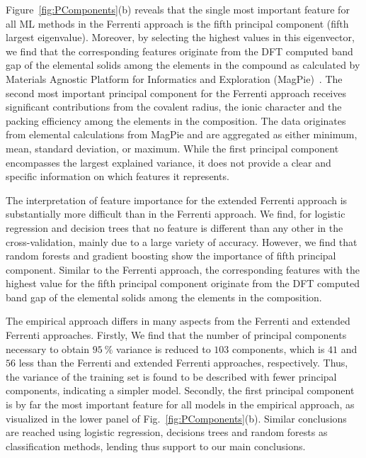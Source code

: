 \documentclass[superscriptaddress,unsortedaddress,
 amsmath,amssymb,
 aps,
]{revtex4-2}
\begin{document}
Figure~\ref{fig:PComponents}(b) reveals that the single most important feature for all ML methods in the Ferrenti approach is the fifth principal component (fifth largest eigenvalue). Moreover, by selecting the highest values in this eigenvector, we find that the corresponding features originate from the DFT computed band gap of the elemental solids among the elements in the compound as calculated by Materials Agnostic Platform for Informatics and Exploration (MagPie)~\cite{magpie}. 
The second most important principal component for the Ferrenti approach receives significant contributions from the  
covalent radius, the ionic character and the packing efficiency  
among the elements in the composition. 
The data originates from elemental calculations from MagPie and are aggregated as either minimum, mean, standard deviation, or maximum. 
While the first principal component encompasses the largest explained variance, it does not provide a clear and  specific information on which features it represents.

The interpretation of feature importance for the extended Ferrenti approach is substantially more difficult than in the Ferrenti approach. We find, for logistic regression and decision trees that no feature is different than any other in the cross-validation, mainly due to a large variety of accuracy. However, we find that random forests and gradient boosting show the importance of  fifth principal component. Similar to the Ferrenti approach, the corresponding features with the highest value for the fifth principal component originate from the DFT computed band gap of the elemental solids among the elements in the composition. 

The empirical approach differs in many aspects from the Ferrenti and extended Ferrenti approaches. 
Firstly, We find that the number of principal components necessary to obtain $95 \ \%$ variance is reduced to $103$ components, which is $41$ and $56$ less than the Ferrenti and extended Ferrenti approaches, respectively. Thus, the variance of the training set is found to be described with fewer principal components, indicating a simpler model.   
Secondly, the first principal component is by far the most important feature for all models in the empirical approach, as visualized in the lower panel of Fig.~\ref{fig:PComponents}(b). Similar conclusions are reached using logistic regression, decisions trees and random forests as classification methods, lending thus support to our main conclusions.
\end{document}
